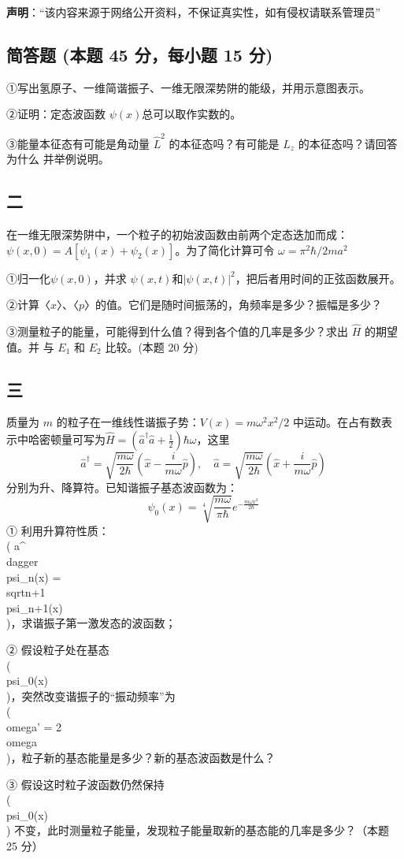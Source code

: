 
\textbf{声明}：“该内容来源于网络公开资料，不保证真实性，如有侵权请联系管理员”

\subsection{简答题 (本题 45 分，每小题 15 分)}
①写出氢原子、一维简谐振子、一维无限深势阱的能级，并用示意图表示。

②证明：定态波函数 $\psi(x)$总可以取作实数的。

③能量本征态有可能是角动量 $\hat{L}^2$ 的本征态吗？有可能是 $\hat{L}_z$ 的本征态吗？请回答为什么
并举例说明。

\subsection{二}
在一维无限深势阱中，一个粒子的初始波函数由前两个定态迭加而成：$\psi(x,0)=A[\psi_1 (x)
+\psi_2 (x)]$。为了简化计算可令 $\omega=\pi^2\hbar/2ma^2$

①归一化$\psi(x,0)$，并求 $\psi(x,t)$和$|\psi(x,t)|^2$，把后者用时间的正弦函数展开。

②计算〈$x$〉、〈$p$〉的值。它们是随时间振荡的，角频率是多少？振幅是多少？

③测量粒子的能量，可能得到什么值？得到各个值的几率是多少？求出 $\hat{H}$ 的期望值。并
与 $E_1$ 和 $E_2$ 比较。(本题 20 分)

\subsection{三}
质量为 $m$ 的粒子在一维线性谐振子势：$V(x)=m\omega^2x^2/2$ 中运动。在占有数表示中哈密顿量可写为$\hat{H} = \left(\hat{a}^\dagger \hat{a} + \frac{1}{2}\right)\hbar\omega$，这里 
$$\hat{a}^\dagger = \sqrt{\frac{m\omega}{2\hbar}} \left( \hat{x} - \frac{i}{m\omega} \hat{p} \right), \quad \hat{a} = \sqrt{\frac{m\omega}{2\hbar}} \left( \hat{x} + \frac{i}{m\omega} \hat{p} \right)~$$分别为升、降算符。已知谐振子基态波函数为：
$$\psi_0(x) = \sqrt[4]{\frac{m\omega}{\pi \hbar}} e^{-\frac{m\omega x^2}{2 \hbar}}~$$
① 利用升算符性质：\\( a^{\\dagger} \\psi_n(x) = \\sqrt{n+1} \\psi_{n+1}(x) \\)，求谐振子第一激发态的波函数；

② 假设粒子处在基态 \\( \\psi_0(x) \\)，突然改变谐振子的“振动频率”为 \\( \\omega' = 2\\omega \\)，粒子新的基态能量是多少？新的基态波函数是什么？

③ 假设这时粒子波函数仍然保持 \\( \\psi_0(x) \\) 不变，此时测量粒子能量，发现粒子能量取新的基态能的几率是多少？（本题 25 分）